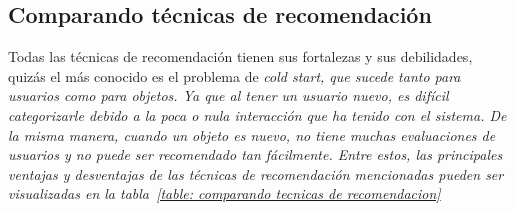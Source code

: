 \subsection{Comparando técnicas de recomendación}
Todas las técnicas de recomendación tienen sus fortalezas y sus debilidades, quizás el más conocido es el problema de \it{cold start}, que sucede tanto para usuarios como para objetos. Ya que al tener un usuario nuevo, es difícil categorizarle debido a la poca o nula interacción que ha tenido con el sistema. De la misma manera, cuando un objeto es nuevo, no tiene muchas evaluaciones de usuarios y no puede ser recomendado tan fácilmente. Entre estos, las principales ventajas y desventajas de las técnicas de recomendación mencionadas pueden ser visualizadas en la tabla~\ref{table: comparando tecnicas de recomendacion}\cite{5}
 		
